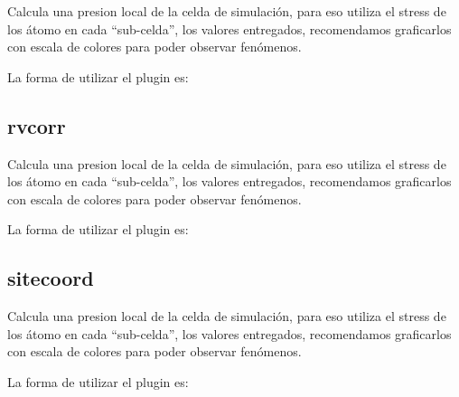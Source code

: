 Calcula una presion local de la celda de simulaci\'on, para eso utiliza el stress de los \'atomo en cada ``sub-celda'', los valores entregados, recomendamos graficarlos con escala de colores para poder observar fen\'omenos. 

La forma de utilizar el plugin es:

\subsection{rvcorr}

Calcula una presion local de la celda de simulaci\'on, para eso utiliza el stress de los \'atomo en cada ``sub-celda'', los valores entregados, recomendamos graficarlos con escala de colores para poder observar fen\'omenos. 

La forma de utilizar el plugin es:

\subsection{sitecoord}

Calcula una presion local de la celda de simulaci\'on, para eso utiliza el stress de los \'atomo en cada ``sub-celda'', los valores entregados, recomendamos graficarlos con escala de colores para poder observar fen\'omenos. 

La forma de utilizar el plugin es:


